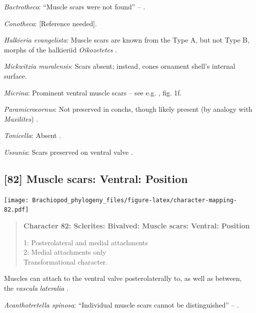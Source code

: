 \documentclass[openany]{book}
\begin{document}
\hypertarget{Bactrotheca-coding-81}{}
\emph{Bactrotheca}: ``Muscle scars were not found'' --
\citet{Valent2012}.

\hypertarget{Conotheca-coding-81}{}
\emph{Conotheca}: {[}Reference needed{]}.

\hypertarget{Halkieria_evangelista-coding-81}{}
\emph{Halkieria evangelista}: Muscle scars are known from the Type A,
but not Type B, morphs of the halkieriid \emph{Oikozetetes}
\citep{Paterson2009, Jacquet2014}.

\hypertarget{Mickwitzia_muralensis-coding-81}{}
\emph{Mickwitzia muralensis}: Scars absent; instead, cones ornament
shell's internal surface.

\hypertarget{Micrina-coding-81}{}
\emph{Micrina}: Prominent ventral muscle scars -- see e.g.
\citet{Holmer2008TheEarly}, fig. 1f.

\hypertarget{Paramicrocornus-coding-81}{}
\emph{Paramicrocornus}: Not preserved in conchs, though likely present
(by analogy with \emph{Maxilites}) \citep{Zhang2018Ahyolithid}.

\hypertarget{Tonicella-coding-81}{}
\emph{Tonicella}: Absent \citep{Schwabe2010}.

\hypertarget{Ussunia-coding-81}{}
\emph{Ussunia}: Scars preserved on ventral valve \citep{Nikitin1984}.

\subsection*{{[}82{]} Muscle scars: Ventral:
Position}\label{muscle-scars-ventral-position}

\texttt{[image: Brachiopod\_phylogeny\_files/figure-latex/character-mapping-82.pdf]}

\begin{quote}
\textbf{Character 82: Sclerites: Bivalved: Muscle scars: Ventral:
Position}

1: Posterolateral and medial attachments\\
2: Medial attachments only\\
Transformational character.
\end{quote}

Muscles can attach to the ventral valve posterolaterally to, as well as
between, the \emph{vascula} \emph{lateralia}
\citep{Popov1992TheCambrian}.

\hypertarget{Acanthotretella_spinosa-coding-82}{}
\emph{Acanthotretella spinosa}: ``Individual muscle scars cannot be
distinguished'' -- \citet{Holmer2006Aspinose}.
\end{document}
